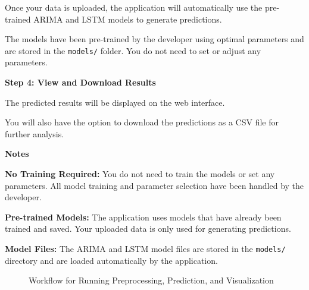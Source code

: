 Once your data is uploaded, the application will automatically use the pre-trained ARIMA and LSTM models to generate predictions.

The models have been pre-trained by the developer using optimal parameters and are stored in the \texttt{models/} folder. You do not need to set or adjust any parameters.

\textbf{Step 4: View and Download Results}

The predicted results will be displayed on the web interface.

You will also have the option to download the predictions as a CSV file for further analysis.

\textbf{Notes}

\textbf{No Training Required:} You do not need to train the models or set any parameters. All model training and parameter selection have been handled by the developer.

\textbf{Pre-trained Models:} The application uses models that have already been trained and saved. Your uploaded data is only used for generating predictions.

\textbf{Model Files:} The ARIMA and LSTM model files are stored in the \texttt{models/} directory and are loaded automatically by the application.

\begin{figure}[h]
	\centering
	\caption{Workflow for Running Preprocessing, Prediction, and Visualization}
\end{figure}

